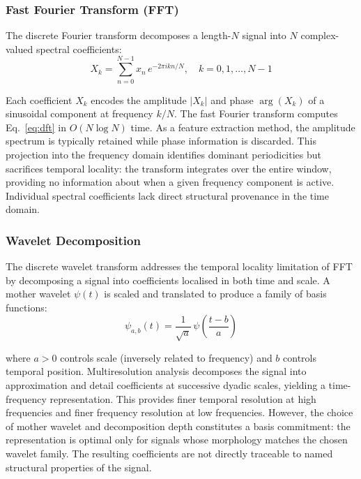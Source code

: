 \documentclass[a4paper,12pt]{article}
\begin{document}
\subsubsection{Fast Fourier Transform (FFT)}

The discrete Fourier transform decomposes a length-$N$ signal into $N$ complex-valued spectral coefficients:
\begin{equation}
X_k = \sum_{n=0}^{N-1} x_n \, e^{-2\pi i k n / N}, \quad k = 0, 1, \ldots, N-1
\label{eq:dft}
\end{equation}

Each coefficient $X_k$ encodes the amplitude $|X_k|$ and phase $\arg(X_k)$ of a sinusoidal component at frequency $k/N$. The fast Fourier transform computes Eq.~\ref{eq:dft} in $O(N \log N)$ time. As a feature extraction method, the amplitude spectrum is typically retained while phase information is discarded. This projection into the frequency domain identifies dominant periodicities but sacrifices temporal locality: the transform integrates over the entire window, providing no information about when a given frequency component is active. Individual spectral coefficients lack direct structural provenance in the time domain.

\subsubsection{Wavelet Decomposition}

The discrete wavelet transform addresses the temporal locality limitation of FFT by decomposing a signal into coefficients localised in both time and scale. A mother wavelet $\psi(t)$ is scaled and translated to produce a family of basis functions:
\begin{equation}
\psi_{a,b}(t) = \frac{1}{\sqrt{a}}\,\psi\!\left(\frac{t - b}{a}\right)
\label{eq:wavelet}
\end{equation}

where $a > 0$ controls scale (inversely related to frequency) and $b$ controls temporal position. Multiresolution analysis decomposes the signal into approximation and detail coefficients at successive dyadic scales, yielding a time-frequency representation. This provides finer temporal resolution at high frequencies and finer frequency resolution at low frequencies. However, the choice of mother wavelet and decomposition depth constitutes a basis commitment: the representation is optimal only for signals whose morphology matches the chosen wavelet family. The resulting coefficients are not directly traceable to named structural properties of the signal.
\end{document}
